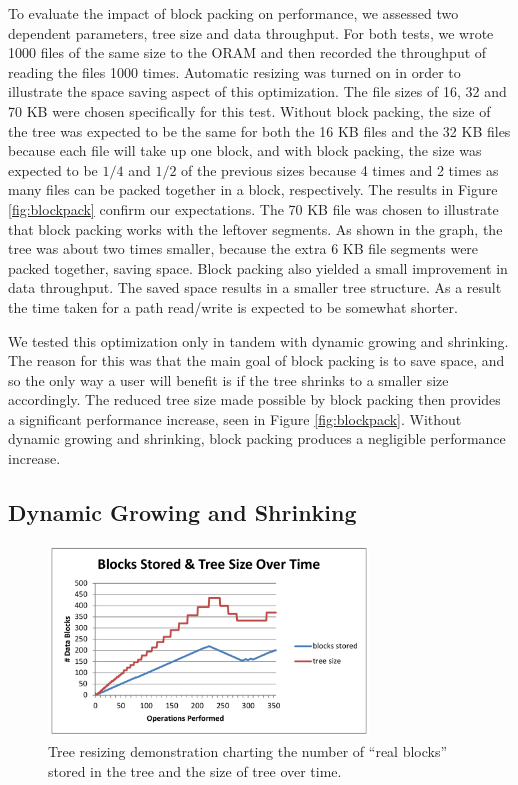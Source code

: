 \documentclass[conference]{IEEEtran}
\begin{document}
To evaluate the impact of block packing on performance, we assessed two dependent parameters, tree size and data throughput. For both tests, we wrote 1000 files of the same size to the ORAM and then recorded the throughput of reading the files 1000 times. Automatic resizing was turned on in order to illustrate the space saving aspect of this optimization. The file sizes of 16, 32 and 70 KB were chosen specifically for this test. Without block packing, the size of the tree was expected to be the same for both the 16 KB files and the 32 KB files because each file will take up one block, and with block packing, the size was expected to be $1/4$ and $1/2$ of the previous sizes because 4 times and 2 times as many files can be packed together in a block, respectively. The results in Figure \ref{fig:blockpack} confirm our expectations. The 70 KB file was chosen to illustrate that block packing works with the leftover segments. As shown in the graph, the tree was about two times smaller, because the extra 6 KB file segments were packed together, saving space. Block packing also yielded a small improvement in data throughput. The saved space results in a smaller tree structure. As a result the time taken for a path read/write is expected to be somewhat shorter.

We tested this optimization only in tandem with dynamic growing and shrinking. The reason for this was that the main goal of block packing is to save space, and so the only way a user will benefit is if the tree shrinks to a smaller size accordingly. The reduced tree size made possible by block packing then provides a significant performance increase, seen in Figure \ref{fig:blockpack}. Without dynamic growing and shrinking, block packing produces a negligible performance increase.

\subsection{Dynamic Growing and Shrinking}
\begin{figure}
\begin{center}
\noindent\includegraphics[width=8.5cm]{560.pdf}
\caption{Tree resizing demonstration charting the number of ``real blocks'' stored in the tree and the size of tree over time.}
\label{fig:resizing}
\end{center}
\end{figure}
\end{document}

